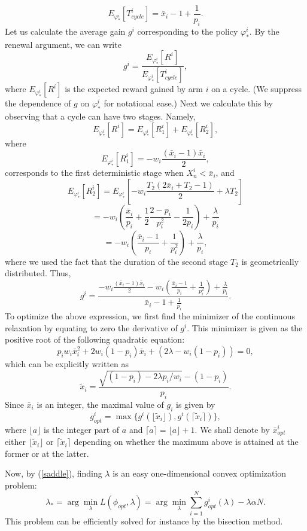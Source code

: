 \documentclass[12pt]{article}
\numberwithin{equation}{section}
\newcommand{\1}{\textbf{1}}
\begin{document}
\begin{equation}
\label{eq:Tcycle}
E_{\varphi^i_*}[T^i_{cycle}] = \bar{x}_i - 1 + \frac{1}{p_i}.
\end{equation}
Let us calculate the average gain $g^i$ corresponding to the policy $\varphi^i_*$.
By the renewal argument, we can write
$$
g^i = \frac{E_{\varphi^i_*}[R^i]}{E_{\varphi^i_*}[T^i_{cycle}]},
$$
where $E_{\varphi^i_*}[R^i]$ is the expected reward gained by arm $i$ on a cycle. (We suppress the dependence of $g$ on $\varphi^i_*$ for notational ease.) 
Next we calculate this by observing that a cycle can have two stages. Namely,
$$
E_{\varphi^i_*}[R^i] = E_{\varphi^i_*}[R^i_1] + E_{\varphi^i_*}[R^i_2],
$$
where
$$
E_{\varphi^i_*}[R^i_1] = -w_i \frac{(\bar{x}_i-1)\bar{x}_i}{2},
$$
corresponds to the first deterministic stage when $X^i_n < \bar{x}_i$,
and
$$
E_{\varphi^i_*}[R^i_2] = E_{\varphi^i_*}\left[-w_i\frac{T_2(2\bar{x}_i+T_2-1)}{2} + \lambda T_2\right]
$$
$$
= -w_i \left(\frac{\bar{x}_i}{p_i}+\frac{1}{2}\frac{2-p_i}{p_i^2} - \frac{1}{2p_i}\right) + \frac{\lambda}{p_i}
$$
$$
= -w_i \left( \frac{\bar{x}_i-1}{p_i}+\frac{1}{p_i^2} \right) + \frac{\lambda}{p_i},
$$
where we used the fact that the duration of the second stage $T_2$ is geometrically
distributed. Thus,
$$
g^i =
\frac{-w_i \frac{(\bar{x}_i-1)\bar{x}_i}{2} - w_i \left( \frac{\bar{x}_i-1}{p_i}+\frac{1}{p_i^2} \right) 
+ \frac{\lambda}{p_i}}{\bar{x}_i - 1 + \frac{1}{p_i}}.
$$
To optimize the above expression, we first find the minimizer of the continuous relaxation
by equating to zero the derivative of $g^i$. This minimizer is given as the positive root 
of the following quadratic equation:
$$
p_i w_i \bar{x}_i^2 + 2 w_i (1-p_i) \bar{x}_i + (2\lambda - w_i(1-p_i)) = 0,
$$
which can be explicitly written as
$$
\tilde{x}_i = \frac{\sqrt{(1-p_i)-2\lambda p_i/w_i}-(1-p_i)}{p_i}.
$$
Since $\bar{x}_i$ is an integer, the maximal value of $g_i$ is given by
\begin{equation}
\label{eq:gainopt}
g^i_{opt} = \max \{ g^i(\lfloor \tilde{x}_i \rfloor), g^i(\lceil\tilde{x}_i\rceil) \},
\end{equation}
where $\lfloor a \rfloor$ is the integer part of $a$ and $\lceil a \rceil = \lfloor a \rfloor + 1$. We shall denote by $\bar{x}^i_{opt}$ either $\lfloor \tilde{x}_i \rfloor$ or $\lceil\tilde{x}_i\rceil$ depending on whether the maximum above is attained at the former or at the latter. 

Now, by (\ref{saddle}), finding $\lambda$ is an easy one-dimensional convex optimization problem:
\begin{equation}
\label{eq:lambdaopt}
\lambda_* = \arg \min_\lambda L(\phi_{opt},\lambda) = \arg \min_\lambda \sum_{i=1}^{N} g^i_{opt}(\lambda) - \lambda \alpha N.
\end{equation}
This problem can be efficiently solved for instance by the bisection method.
\end{document}
